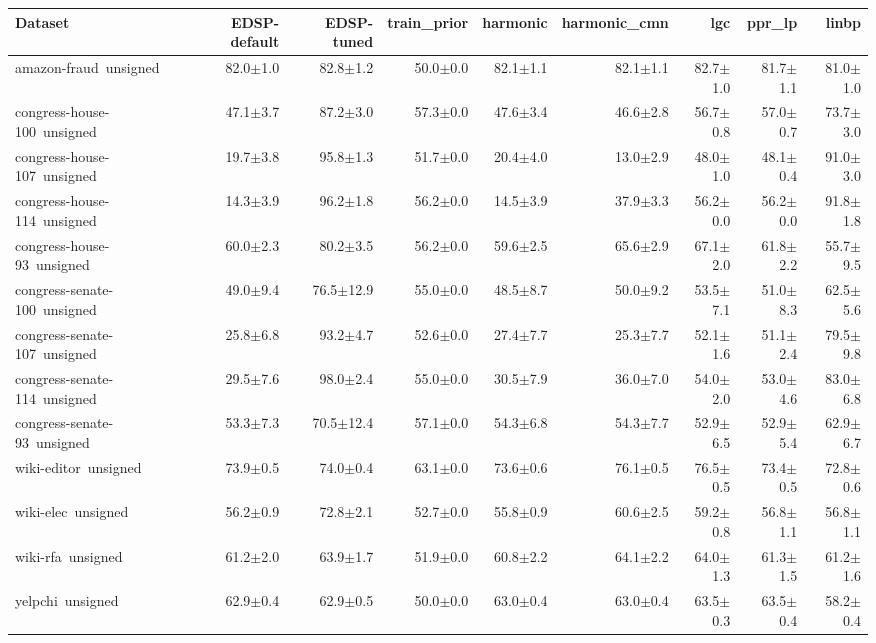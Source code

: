 \begin{tabular}{lrrrrrrrr}
\toprule
Dataset & EDSP-default & EDSP-tuned & train\_prior & harmonic & harmonic\_cmn & lgc & ppr\_lp & linbp \\
\midrule
amazon-fraud~unsigned & 82.0$\pm$1.0 & 82.8$\pm$1.2 & 50.0$\pm$0.0 & 82.1$\pm$1.1 & 82.1$\pm$1.1 & 82.7$\pm$1.0 & 81.7$\pm$1.1 & 81.0$\pm$1.0 \\
congress-house-100~unsigned & 47.1$\pm$3.7 & 87.2$\pm$3.0 & 57.3$\pm$0.0 & 47.6$\pm$3.4 & 46.6$\pm$2.8 & 56.7$\pm$0.8 & 57.0$\pm$0.7 & 73.7$\pm$3.0 \\
congress-house-107~unsigned & 19.7$\pm$3.8 & 95.8$\pm$1.3 & 51.7$\pm$0.0 & 20.4$\pm$4.0 & 13.0$\pm$2.9 & 48.0$\pm$1.0 & 48.1$\pm$0.4 & 91.0$\pm$3.0 \\
congress-house-114~unsigned & 14.3$\pm$3.9 & 96.2$\pm$1.8 & 56.2$\pm$0.0 & 14.5$\pm$3.9 & 37.9$\pm$3.3 & 56.2$\pm$0.0 & 56.2$\pm$0.0 & 91.8$\pm$1.8 \\
congress-house-93~unsigned & 60.0$\pm$2.3 & 80.2$\pm$3.5 & 56.2$\pm$0.0 & 59.6$\pm$2.5 & 65.6$\pm$2.9 & 67.1$\pm$2.0 & 61.8$\pm$2.2 & 55.7$\pm$9.5 \\
congress-senate-100~unsigned & 49.0$\pm$9.4 & 76.5$\pm$12.9 & 55.0$\pm$0.0 & 48.5$\pm$8.7 & 50.0$\pm$9.2 & 53.5$\pm$7.1 & 51.0$\pm$8.3 & 62.5$\pm$5.6 \\
congress-senate-107~unsigned & 25.8$\pm$6.8 & 93.2$\pm$4.7 & 52.6$\pm$0.0 & 27.4$\pm$7.7 & 25.3$\pm$7.7 & 52.1$\pm$1.6 & 51.1$\pm$2.4 & 79.5$\pm$9.8 \\
congress-senate-114~unsigned & 29.5$\pm$7.6 & 98.0$\pm$2.4 & 55.0$\pm$0.0 & 30.5$\pm$7.9 & 36.0$\pm$7.0 & 54.0$\pm$2.0 & 53.0$\pm$4.6 & 83.0$\pm$6.8 \\
congress-senate-93~unsigned & 53.3$\pm$7.3 & 70.5$\pm$12.4 & 57.1$\pm$0.0 & 54.3$\pm$6.8 & 54.3$\pm$7.7 & 52.9$\pm$6.5 & 52.9$\pm$5.4 & 62.9$\pm$6.7 \\
wiki-editor~unsigned & 73.9$\pm$0.5 & 74.0$\pm$0.4 & 63.1$\pm$0.0 & 73.6$\pm$0.6 & 76.1$\pm$0.5 & 76.5$\pm$0.5 & 73.4$\pm$0.5 & 72.8$\pm$0.6 \\
wiki-elec~unsigned & 56.2$\pm$0.9 & 72.8$\pm$2.1 & 52.7$\pm$0.0 & 55.8$\pm$0.9 & 60.6$\pm$2.5 & 59.2$\pm$0.8 & 56.8$\pm$1.1 & 56.8$\pm$1.1 \\
wiki-rfa~unsigned & 61.2$\pm$2.0 & 63.9$\pm$1.7 & 51.9$\pm$0.0 & 60.8$\pm$2.2 & 64.1$\pm$2.2 & 64.0$\pm$1.3 & 61.3$\pm$1.5 & 61.2$\pm$1.6 \\
yelpchi~unsigned & 62.9$\pm$0.4 & 62.9$\pm$0.5 & 50.0$\pm$0.0 & 63.0$\pm$0.4 & 63.0$\pm$0.4 & 63.5$\pm$0.3 & 63.5$\pm$0.4 & 58.2$\pm$0.4 \\
\bottomrule
\end{tabular}
